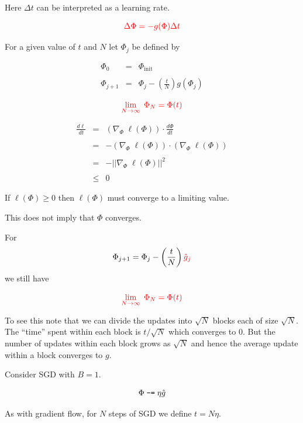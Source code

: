 {\vfill
Here $\Delta t$ can be interpreted as a learning rate.


$${\color{red} \Delta \Phi = - g(\Phi)\Delta t}$$

\vfill
For a given value of $t$ and $N$ let $\Phi_j$ be defined by

\vfill
\begin{eqnarray*}
\Phi_0 & = & \Phi_{\mathrm{init}} \\
\\
\Phi_{j+1} & = & \Phi_j - \left(\frac{t}{N}\right) g(\Phi_j)
\end{eqnarray*}

\vfill
$${\color{red} \lim_{N\rightarrow \infty} \;\Phi_N = \Phi(t)}$$



\begin{eqnarray*}
  \frac{d \ell}{d t} & = & (\nabla_\Phi \;\ell(\Phi)) \cdot \frac{d \Phi}{dt} \\
  \\
  & = & - (\nabla_\Phi \;\ell(\Phi)) \cdot (\nabla_\Phi \;\ell(\Phi)) \\
  \\
  & = & - ||\nabla_\Phi \;\ell(\Phi)||^2 \\
  \\
  & \leq & 0
\end{eqnarray*}

\vfill
If $\ell(\Phi) \geq 0$ then $\ell(\Phi)$ must converge to a limiting value.

\vfill
This does not imply that $\Phi$ converges.

For
$$\Phi_{j+1} = \Phi_j - \left(\frac{t}{N}\right) {\color{red} \hat{g}_j}$$
we still have

\vfill
$${\color{red} \lim_{N\rightarrow \infty} \;\Phi_N = \Phi(t)}$$

\vfill
To see this note that we can divide the updates into $\sqrt{N}$ blocks each of size $\sqrt{N}$.  The ``time'' spent within each block is $t/\sqrt{N}$ which converges to 0.
But the number of updates within each block grows as $\sqrt{N}$ and hence the average update within a block converges to $g$.



Consider SGD with $B = 1$.

$$\Phi \;\mbox{\tt -=}\; \eta\hat{g}$$

\vfill
As with gradient flow, for $N$ steps of SGD we define $t = N \eta$.

}
